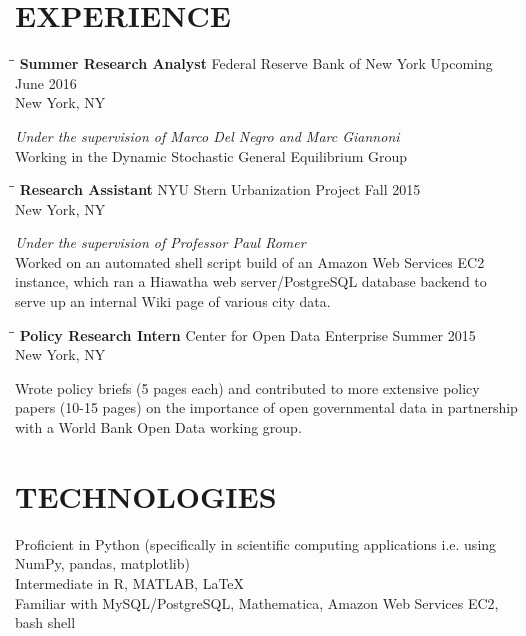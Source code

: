 \documentclass{res}
\begin{document}
\begin{resume}
\section{EXPERIENCE}
   \vspace{-0.1in}	
   \begin{tabbing}
   \hspace{2.3in}\= \hspace{2.6in}\= \kill %
    {\bf Summer Research Analyst} \>Federal Reserve Bank of New York     \>Upcoming June 2016\\
                             \>New York, NY
   \end{tabbing}\vspace{-20pt}      %
    \textit{Under the supervision of Marco Del Negro and Marc Giannoni} \\
    Working in the Dynamic Stochastic General Equilibrium Group
   \begin{tabbing}
   \hspace{2.3in}\= \hspace{2.6in}\= \kill %
    {\bf Research Assistant} \>NYU Stern Urbanization Project \> Fall 2015\\
                          \>New York, NY
   \end{tabbing}\vspace{-20pt}
    \textit{Under the supervision of Professor Paul Romer} \\
    Worked on an automated shell script build of an Amazon Web Services EC2 instance, which ran a Hiawatha web server/PostgreSQL database backend to serve up an internal Wiki page of various city data.
   \begin{tabbing}%
   \hspace{2.3in}\= \hspace{2.6in}\= \kill %
   {\bf Policy Research Intern}  \>Center for Open Data Enterprise \> Summer  2015\\
                          \>New York, NY
   \end{tabbing}\vspace{-20pt}
    Wrote policy briefs (5 pages each) and contributed to more extensive policy papers (10-15 pages) on the importance of open governmental data in partnership with a World Bank Open Data working group.       


\section{TECHNOLOGIES}          
    Proficient in Python (specifically in scientific computing applications i.e. using NumPy, pandas, matplotlib) \\         
    Intermediate in R, MATLAB, \LaTeX \\
    Familiar with MySQL/PostgreSQL, Mathematica, Amazon Web Services EC2, bash shell          
 
 
   
    
\end{resume}
\end{document}

